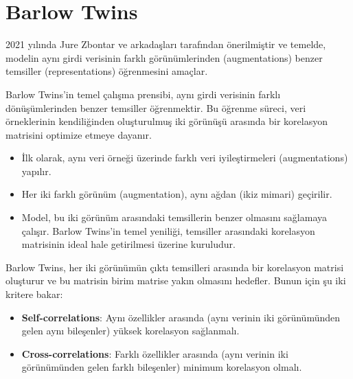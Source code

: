 \section{Barlow Twins}

2021 yılında Jure Zbontar ve arkadaşları tarafından önerilmiştir ve temelde, modelin aynı girdi verisinin farklı görünümlerinden (augmentations) benzer temsiller (representations) öğrenmesini amaçlar.

Barlow Twins’in temel çalışma prensibi, aynı girdi verisinin farklı dönüşümlerinden benzer temsiller öğrenmektir. Bu öğrenme süreci, veri örneklerinin kendiliğinden oluşturulmuş iki görünüşü arasında bir korelasyon matrisini optimize etmeye dayanır.

\begin{itemize}
    \item İlk olarak, aynı veri örneği üzerinde farklı veri iyileştirmeleri (augmentations) yapılır.
    \item Her iki farklı görünüm (augmentation), aynı ağdan (ikiz mimari) geçirilir.
    \item Model, bu iki görünüm arasındaki temsillerin benzer olmasını sağlamaya çalışır. Barlow Twins'in temel yeniliği, temsiller arasındaki korelasyon matrisinin ideal hale getirilmesi üzerine kuruludur.
\end{itemize}

Barlow Twins, her iki görünümün çıktı temsilleri arasında bir korelasyon matrisi oluşturur ve bu matrisin birim matrise yakın olmasını hedefler. Bunun için şu iki kritere bakar:

\begin{itemize}
    \item \textbf{Self-correlations}: Aynı özellikler arasında (aynı verinin iki görünümünden gelen aynı bileşenler) yüksek korelasyon sağlanmalı.
    \item \textbf{Cross-correlations}: Farklı özellikler arasında (aynı verinin iki görünümünden gelen farklı bileşenler) minimum korelasyon olmalı.
\end{itemize}

\newpage